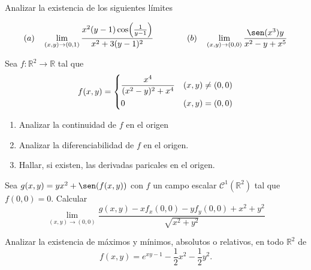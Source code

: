 
\begin{question}
    Analizar la existencia de los siguientes límites

    \[
        (a) \quad \lim_{(x,y)\to(0,1)} \frac{x^2(y-1)\cos(\frac{1}{y-1})}{x^2+3(y-1)^2}
        \hfill
        \qquad\qquad(b) \quad \lim_{(x,y)\to(0,0)} \frac{\sen(x^3)y}{x^2-y+x^5}
    \]

\end{question}


\begin{question}
    Sea \(f: \mathbb{R}^2 \to \mathbb{R}\) tal que
    \[
        f(x,y) =
        \begin{dcases}
            \frac{x^4}{(x^2-y)^2+x^4} & (x,y) \neq (0,0) \\
            0                         & (x,y) = (0,0)
        \end{dcases}
    \]
    \begin{enumerate}
        \item Analizar la continuidad de $f$ en el origen
        \item Analizar la diferenciabilidad de $f$ en el origen.
        \item Hallar, si existen, las derivadas paricales en el origen.
    \end{enumerate}
\end{question}


\begin{question}
    Sea \(g(x,y) = yx^2+\sen(f(x,y))\) con $f$ un campo escalar \(\mathcal{C}^1(\mathbb{R}^2)\) tal que \(f(0,0)=0\). Calcular
    \[
        \lim_{(x,y)\to(0,0)} \frac{g(x,y)-xf_x(0,0)-yf_y(0,0)+x^2+y^2}{\sqrt{x^2+y^2}}
    \]
\end{question}


\begin{question}
    Analizar la existencia de máximos y mínimos, absolutos o relativos, en todo $\mathbb{R}^2$ de
    \[
        f(x,y) = e^{xy-1}-\frac{1}{2}x^2-\frac{1}{2}y^2.
    \]
\end{question}

\newpage


